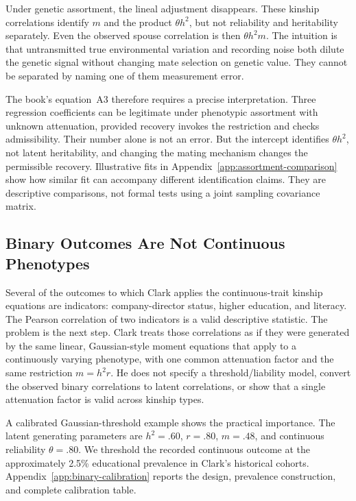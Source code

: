 Under genetic assortment, the lineal adjustment disappears. These
kinship correlations identify $m$ and the product $\theta h^2$, but not
reliability and heritability separately. Even the observed spouse
correlation is then $\theta h^2m$. The intuition is that untransmitted
true environmental variation and recording noise both dilute the genetic
signal without changing mate selection on genetic value. They cannot be
separated by naming one of them measurement error.

The book's equation~A3 \citep[Technical Appendix]{Clark2026} therefore requires a precise interpretation. Three
regression coefficients can be legitimate under phenotypic assortment
with unknown attenuation, provided recovery invokes the restriction and
checks admissibility. Their number alone is not an error. But the
intercept identifies $\theta h^2$, not latent heritability, and changing
the mating mechanism changes the permissible recovery. Illustrative fits
in Appendix~\ref{app:assortment-comparison} show how similar fit can accompany
different identification claims. They are descriptive comparisons, not
formal tests using a joint sampling covariance matrix.

\subsection{Binary Outcomes Are Not Continuous Phenotypes}
\label{sec:binary-outcomes}

Several of the outcomes to which Clark applies the continuous-trait kinship
equations are indicators: company-director status, higher education, and
literacy. The Pearson correlation of two indicators is a valid descriptive
statistic. The problem is the next step. Clark treats those correlations as
if they were generated by the same linear, Gaussian-style moment equations
that apply to a continuously varying phenotype, with one common attenuation
factor and the same restriction $m=h^2r$. He does not specify a
threshold/liability model, convert the observed binary correlations to latent
correlations, or show that a single attenuation factor is valid across
kinship types.

A calibrated Gaussian-threshold example shows the practical importance.
The latent generating parameters are $h^2=.60$, $r=.80$, $m=.48$, and
continuous reliability $\theta=.80$. We threshold the recorded continuous
outcome at the approximately 2.5\% educational prevalence in Clark's
historical cohorts. Appendix~\ref{app:binary-calibration} reports the design,
prevalence construction, and complete calibration table.

